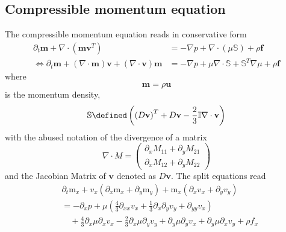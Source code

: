 \subsection{Compressible momentum equation}
\label{sub:Compressible momentum equation}
The compressible momentum equation reads in conservative form
\begin{equation}
  \label{eq:compressible NS}
  \begin{aligned}
    \partial_t \mathbf{m} + \nabla \cdot (\mathbf{m}\mathbf{v}^T)
    &= - \nabla p + \nabla \cdot (\mu\mathbb{S}) + \rho \mathbf{f} \\
    \Leftrightarrow\partial_t \mathbf{m} + (\nabla \cdot \mathbf{m})\mathbf{v} + (\nabla \cdot \mathbf{v})\mathbf{m}
    &= - \nabla p + \mu \nabla \cdot \mathbb{S} + \mathbb{S}^T \nabla\mu + \rho \mathbf{f}
  \end{aligned}
\end{equation}
where
\begin{equation}
  \mathbf{m} = \rho \mathbf{u}
\end{equation}
is the momentum density,
\begin{equation}
  \mathbb{S} \defined \left({(D\mathbf{v})}^T + D\mathbf{v} - \frac{2}{3}\mathbb{I}\nabla\cdot\mathbf{v} \right)
\end{equation}
with the abused notation of the divergence of a matrix
\begin{equation}
  \nabla \cdot M =
  \begin{pmatrix}
    \partial_x M_{11} + \partial_y M_{21} \\
    \partial_x M_{12} + \partial_y M_{22}
  \end{pmatrix}
\end{equation}
and the Jacobian Matrix of $\mathbf{v}$ denoted as $D\mathbf{v}$.
The split equations read
\begin{equation}
  \begin{aligned}
    & \partial_t \text{m}_x
    + v_x (\partial_x \text{m}_x + \partial_y \text{m}_y)
    + \text{m}_x (\partial_x v_x + \partial_y v_y)  \\
    & =
     - \partial_x p
     + \mu \left(\frac{4}{3}\partial_{xx}v_x
            + \frac{1}{3}\partial_x\partial_y v_y
            + \partial_{yy} v_x \right) \\
    &\quad + \frac{4}{3}\partial_x \mu \partial_x v_x
    - \frac{2}{3}\partial_x \mu \partial_y v_y
    + \partial_y \mu \partial_y v_x
    + \partial_y \mu \partial_x v_y
    + \rho f_x
  \end{aligned}
\end{equation}

